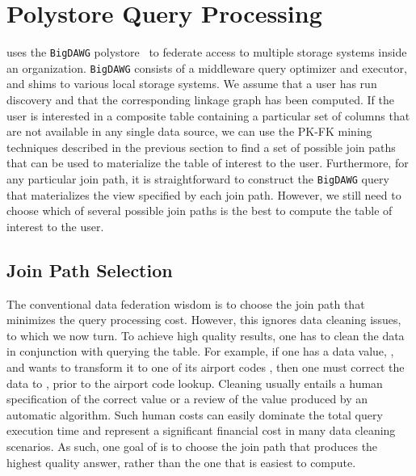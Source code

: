 \section{Polystore Query Processing}
\label{sec:curating}

\dcv uses the \texttt{BigDAWG}
polystore~\cite{DBLP:journals/pvldb/ElmoreDSBCGHHKK15} to federate access to
multiple storage systems inside an organization. \texttt{BigDAWG} consists of a
middleware query optimizer and executor, and shims to various local storage
systems. We assume that a user has run discovery and that the corresponding
linkage graph has been computed.  If the user is interested in a composite table
containing a particular set of columns that are not available in any single data
source,  we can use the PK-FK mining techniques described in the previous
section to find a set of possible join paths that can be used to materialize the
table of interest to the user. Furthermore, for any particular join path, it is
straightforward to construct the \texttt{BigDAWG} query that materializes the
view specified by each join path. However, we still need to choose which of
several possible join paths is the best to compute the table of interest to the
user.
	



\subsection{Join Path Selection}

The conventional data federation wisdom is to choose the join path that minimizes the query processing cost. However, this ignores data cleaning issues, to which we now turn. To achieve high quality results, one has to clean the data in conjunction with querying the table. For example, if one has a data value, , and wants to transform it to one of its airport codes , then one must correct the data to , prior to the airport code lookup. 
Cleaning usually entails a human specification of the correct value or a review of the value produced by an automatic algorithm. 
Such human costs can easily dominate the total query execution time and represent a significant financial cost in many data cleaning scenarios.
As such, one goal of \dcv is to choose the join path that produces the highest quality answer, rather than the one that is easiest to compute. 


